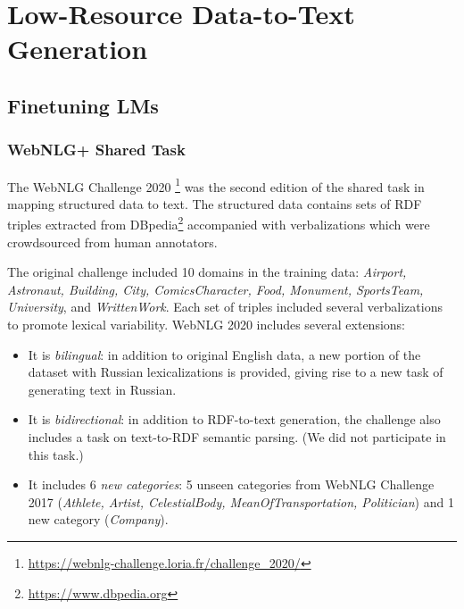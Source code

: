 \chapter{Low-Resource Data-to-Text Generation}
\label{chap:low-res}
\section{Finetuning LMs}
\label{sec:finetuning}


\subsection{WebNLG+ Shared Task}
\label{sec:webnlgp}
The WebNLG Challenge 2020 \cite{ferreira2020BilingualBiDirectional2020}\footnote{\url{https://webnlg-challenge.loria.fr/challenge_2020/}} was the second edition of the shared task in mapping structured data to text. The structured data contains sets of RDF triples extracted from DBpedia\footnote{\url{https://www.dbpedia.org}} accompanied with verbalizations which were crowdsourced from human annotators.

The original challenge \citep{gardentWebNLGChallengeGenerating2017,gardent} included 10 domains in the training data: \textit{Airport, Astronaut, Building, City, ComicsCharacter, Food, Monument, SportsTeam, University}, and \textit{WrittenWork}. Each set of triples included several verbalizations to promote lexical variability. %
WebNLG 2020 includes several extensions:
\begin{itemize}
    \item[(1)] It is \textit{bilingual}: in addition to original English data, a new portion of the dataset with Russian lexicalizations is provided, giving rise to a new task of generating text in Russian.
    \item[(2)] It is \textit{bidirectional}: in addition to RDF-to-text generation, the challenge also includes a task on text-to-RDF semantic parsing. %
        (We did not participate in this task.)
    \item[(3)] It includes 6 \textit{new categories}: 5 unseen categories from WebNLG Challenge 2017 (\textit{Athlete, Artist, CelestialBody, MeanOfTransportation, Politician}) and 1 new category (\textit{Company}).
\end{itemize}




